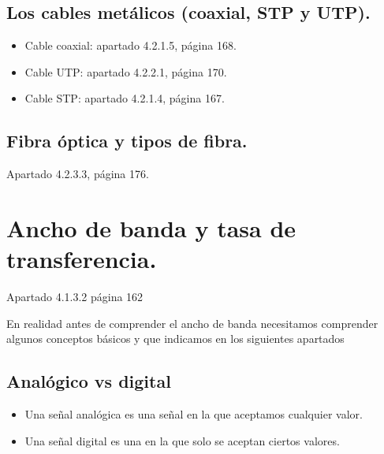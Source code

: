 \documentclass[letterpaper,10pt,spanish]{sphinxmanual}
\begin{document}
\subsection{Los cables metálicos (coaxial, STP y UTP).}
\label{\detokenize{t2_integracion_elementos/apuntes_t2:los-cables-metalicos-coaxial-stp-y-utp}}\begin{itemize}
\item {} 
Cable coaxial: apartado 4.2.1.5, página 168.

\item {} 
Cable UTP: apartado 4.2.2.1, página 170.

\item {} 
Cable STP: apartado 4.2.1.4, página 167.

\end{itemize}


\subsection{Fibra óptica y tipos de fibra.}
\label{\detokenize{t2_integracion_elementos/apuntes_t2:fibra-optica-y-tipos-de-fibra}}
Apartado 4.2.3.3, página 176.


\section{Ancho de banda y tasa de transferencia.}
\label{\detokenize{t2_integracion_elementos/apuntes_t2:ancho-de-banda-y-tasa-de-transferencia}}
Apartado 4.1.3.2 página 162

En realidad antes de comprender el ancho de banda necesitamos comprender algunos conceptos básicos y que indicamos en los siguientes apartados


\subsection{Analógico vs digital}
\label{\detokenize{t2_integracion_elementos/apuntes_t2:analogico-vs-digital}}\begin{itemize}
\item {} 
Una señal analógica es una señal en la que aceptamos cualquier valor.

\item {} 
Una señal digital es una en la que solo se aceptan ciertos valores.

\end{itemize}
\end{document}
